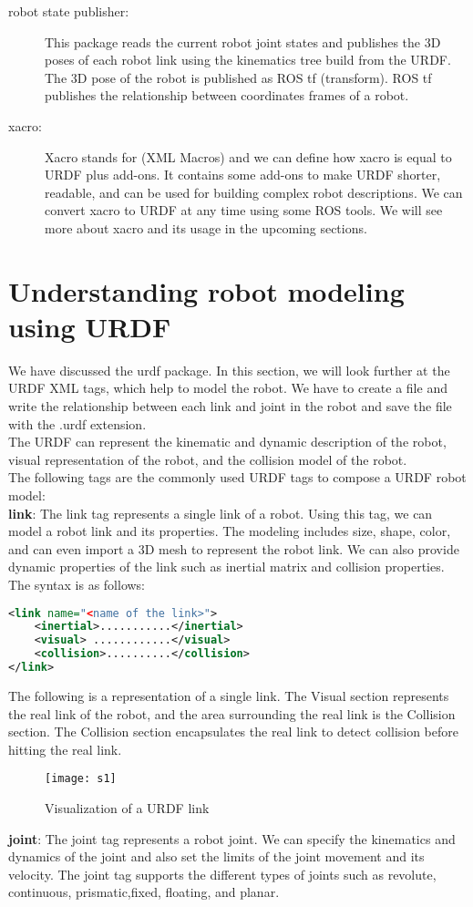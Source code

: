 \begin{description}
\item [{robot state publisher}:]
 This package reads the current robot joint states and publishes the 3D poses of each robot link using the kinematics tree build from the URDF. The 3D pose of the robot is published as ROS tf (transform). ROS tf publishes the relationship between coordinates frames of a robot.


\item [{xacro}:]
 Xacro stands for (XML Macros) and we can define how xacro is equal to URDF plus add-ons. It contains some add-ons to make URDF shorter, readable, and can be used for building complex robot descriptions. We can convert xacro to URDF at any 
time using some ROS tools. We will see more about xacro and its usage in the upcoming sections.
\end{description}
\section{Understanding robot modeling using URDF}

We have discussed the urdf package. In this section, we will look further at the URDF XML tags, which help to model the robot. We have to create a file and write the relationship between each link and joint in the robot and save the file with the .urdf extension.
\\The URDF can represent the kinematic and dynamic description of the robot, visual representation of the robot, and the collision model of the robot.
\\The following tags are the commonly used URDF tags to compose a URDF robot model:
\\ \textbf{link}: The link tag represents a single link of a robot. Using this tag, we can model a robot link and its properties. The modeling includes size, shape, color, and can even import a 3D mesh to represent the robot link. We can also provide dynamic properties of the link such as inertial matrix and collision properties.
\\
The syntax is as follows:
\begin{lstlisting}[language=XML]
<link name="<name of the link>">
    <inertial>...........</inertial>
    <visual> ............</visual>
    <collision>..........</collision>
</link>
\end{lstlisting}

The following is a representation of a single link. The Visual section represents 
the real link of the robot, and the area surrounding the real link is the Collision 
section. The Collision section encapsulates the real link to detect collision before 
hitting the real link.
\begin{figure}[h]
	\centering
	\texttt{[image: s1]}
	\caption{Visualization of a URDF link}
	\label{fig:s1}
\end{figure}
\textbf{joint}: The joint tag represents a robot joint. We can specify the kinematics and dynamics of the joint and also set the limits of the joint movement and its velocity. The joint tag supports the different types of joints such as revolute, continuous, prismatic,fixed, floating, and planar.

